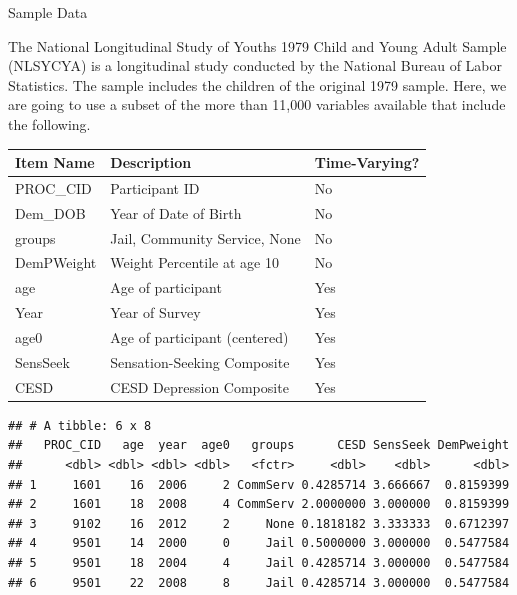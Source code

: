 \begin{frame}[fragile]{Sample Data}

The National Longitudinal Study of Youths 1979 Child and Young Adult
Sample (NLSYCYA) is a longitudinal study conducted by the National
Bureau of Labor Statistics. The sample includes the children of the
original 1979 sample. Here, we are going to use a subset of the more
than 11,000 variables available that include the following.

\begin{longtable}[]{@{}lll@{}}
\toprule
Item Name & Description & Time-Varying?\tabularnewline
\midrule
\endhead
PROC\_CID & Participant ID & No\tabularnewline
Dem\_DOB & Year of Date of Birth & No\tabularnewline
groups & Jail, Community Service, None & No\tabularnewline
DemPWeight & Weight Percentile at age 10 & No\tabularnewline
age & Age of participant & Yes\tabularnewline
Year & Year of Survey & Yes\tabularnewline
age0 & Age of participant (centered) & Yes\tabularnewline
SensSeek & Sensation-Seeking Composite & Yes\tabularnewline
CESD & CESD Depression Composite & Yes\tabularnewline
\bottomrule
\end{longtable}

\begin{Shaded}
\begin{Highlighting}[]
\NormalTok{(}\NormalTok{(}\NormalTok{, } \NormalTok{)))}

\end{Highlighting}
\end{Shaded}

\begin{verbatim}
## # A tibble: 6 x 8
##   PROC_CID   age  year  age0   groups      CESD SensSeek DemPweight
##      <dbl> <dbl> <dbl> <dbl>   <fctr>     <dbl>    <dbl>      <dbl>
## 1     1601    16  2006     2 CommServ 0.4285714 3.666667  0.8159399
## 2     1601    18  2008     4 CommServ 2.0000000 3.000000  0.8159399
## 3     9102    16  2012     2     None 0.1818182 3.333333  0.6712397
## 4     9501    14  2000     0     Jail 0.5000000 3.000000  0.5477584
## 5     9501    18  2004     4     Jail 0.4285714 3.000000  0.5477584
## 6     9501    22  2008     8     Jail 0.4285714 3.000000  0.5477584
\end{verbatim}

\end{frame}

